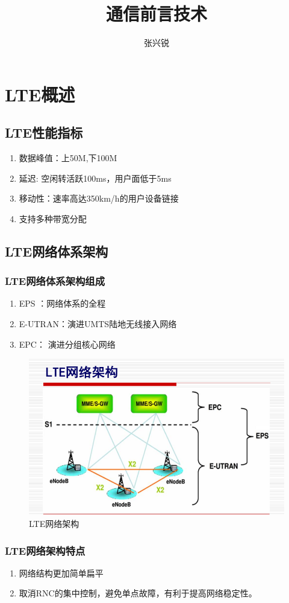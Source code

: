 \documentclass{report}
\begin{document}
	\title{通信前言技术}
	\author{张兴锐}
	\date{}
	\maketitle
	\tableofcontents	
	\chapter{LTE概述}
	\section{LTE性能指标}
	\begin{enumerate}
		\item 数据峰值：上50M,下100M
		\item 延迟: 空闲转活跃100ms，用户面低于5ms
		\item 移动性：速率高达350km/h的用户设备链接
		\item 支持多种带宽分配
	\end{enumerate}
	\section{LTE网络体系架构}
	\subsection{LTE网络体系架构组成}
	\begin{enumerate}
		\item EPS ：网络体系的全程
		\item E-UTRAN：演进UMTS陆地无线接入网络
		\item EPC： 演进分组核心网络
	\end{enumerate}
	\begin{figure}[H]
		\centering
		\includegraphics[width=0.7\linewidth]{LTE网络架构}
		\caption{LTE网络架构}
		\label{fig:lte}
	\end{figure}
	\subsection{LTE网络架构特点}
	\begin{enumerate}
		\item 网络结构更加简单扁平
		\item 取消RNC的集中控制，避免单点故障，有利于提高网络稳定性。
	\end{enumerate}
\end{document}
